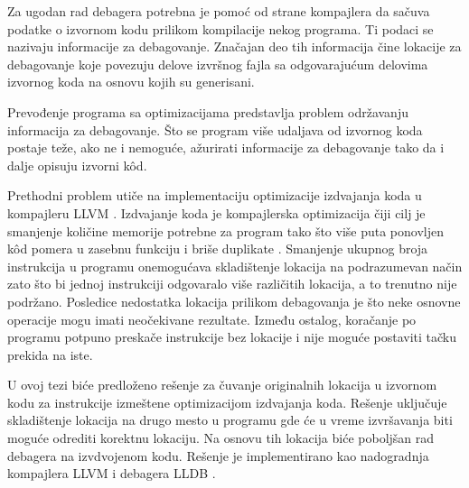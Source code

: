\documentclass[12pt,oneside]{memoir}
\begin{document}
Za ugodan rad debagera potrebna je pomoć od strane kompajlera da sačuva podatke o izvornom kodu prilikom kompilacije nekog programa.
Ti podaci se nazivaju informacije za debagovanje.
Značajan deo tih informacija čine lokacije za debagovanje koje povezuju delove izvršnog fajla sa odgovarajućum delovima izvornog koda na osnovu kojih su generisani.

Prevođenje programa sa optimizacijama predstavlja problem održavanju informacija za debagovanje.
Što se program više udaljava od izvornog koda postaje teže, ako ne i nemoguće, ažurirati informacije za debagovanje tako da i dalje opisuju izvorni k\^od.


Prethodni problem utiče na implementaciju optimizacije izdvajanja koda u kompajleru LLVM \cite{llvm}.
Izdvajanje koda je kompajlerska optimizacija čiji cilj je smanjenje količine memorije potrebne za program tako što više puta ponovljen k\^od pomera u zasebnu funkciju i briše duplikate \cite{grune2012design}.
Smanjenje ukupnog broja instrukcija u programu onemogućava skladištenje lokacija na podrazumevan način zato što bi jednoj instrukciji odgovaralo više različitih lokacija, a to trenutno nije podržano.
Posledice nedostatka lokacija prilikom debagovanja je što neke osnovne operacije mogu imati neočekivane rezultate.
Između ostalog, koračanje po programu potpuno preskače instrukcije bez lokacije i nije moguće postaviti tačku prekida na iste.

U ovoj tezi biće predloženo rešenje za čuvanje originalnih lokacija u izvornom kodu za instrukcije izmeštene optimizacijom izdvajanja koda.
Rešenje uključuje skladištenje lokacija na drugo mesto u programu gde će u vreme izvršavanja biti moguće odrediti korektnu lokaciju.
Na osnovu tih lokacija biće poboljšan rad debagera na izvdvojenom kodu.
Rešenje je implementirano kao nadogradnja kompajlera LLVM i debagera LLDB \cite{lldb}.
\end{document}
